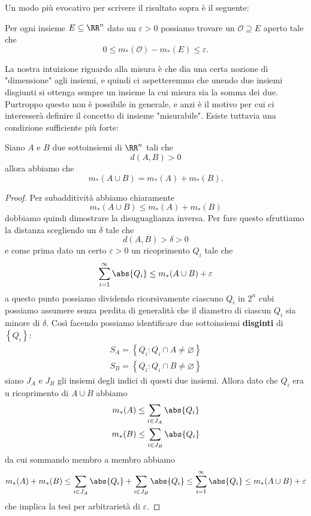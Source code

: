 \documentclass[11pt]{scrartcl}
\newcommand{\eset}{\varnothing}
\begin{document}
	Un modo più evocativo per scrivere il risultato sopra è il seguente:
	\begin{corollary}\label{Rn:approssimabilità con aperti}
		Per ogni insieme $E\subseteq\RR^n$ dato un $\varepsilon>0$ possiamo trovare un $\mathcal{O}\supseteq E$ aperto tale che
		$$0\le m_*(\mathcal{O})-m_*(E)\le \varepsilon.$$
	\end{corollary}
	La nostra intuizione riguardo alla misura è che dia una certa nozione di "dimensione" agli insiemi, e quindi ci aspetteremmo che unendo due insiemi disgiunti si ottenga sempre un insieme la cui misura sia la somma dei due. Purtroppo questo non è possibile in generale, e anzi è il motivo per cui ci interesserà definire il concetto di insieme "misurabile". Esiste tuttavia una condizione sufficiente più forte:
	\begin{proposition}\label{Rn:condizione sufficiente additività}
		Siano $A$ e $B$ due sottoinsiemi di $\RR^n$ tali che
		$$d(A,B)>0$$
		allora abbiamo che 
		$$m_*(A\cup B)=m_*(A)+m_*(B).$$
	\end{proposition}
	\begin{proof}
		Per subadditività abbiamo chiaramente
		$$m_*(A\cup B)\le m_*(A)+m_*(B)$$
		dobbiamo quindi dimostrare la disuguaglianza inversa. Per fare questo sfruttiamo la distanza scegliendo un $\delta$ tale che
		$$d(A,B)>\delta>0$$
		e come prima dato un certo $\varepsilon>0$ un ricoprimento $Q_i$ tale che
		$$\sum_{i=1}^{\infty}\abs{Q_i}\le m_*(A\cup B)+\varepsilon$$
		a questo punto possiamo dividendo ricorsivamente ciascuno $Q_i$ in $2^n$ cubi possiamo assumere senza perdita di generalità che il diametro di ciascun $Q_i$ sia minore di $\delta$. Così facendo possiamo identificare due sottoinsiemi \textbf{disginti} di $\left\{Q_i\right\}$:
		\begin{gather*}
			S_A=\left\{Q_i:Q_i\cap A\ne \eset\right\} \\
			S_B=\left\{Q_i:Q_i\cap B\ne \eset\right\}
		\end{gather*}
		siano $J_A$ e $J_B$ gli insiemi degli indici di questi due insiemi. Allora dato che $Q_i$ era u ricoprimento di $A\cup B$ abbiamo
		\begin{gather*}
			m_*(A)\le \sum_{i\in J_A}\abs{Q_i} \\
			m_*(B)\le \sum_{i\in J_B}\abs{Q_i}
		\end{gather*}
		da cui sommando membro a membro abbiamo
		$$m_*(A)+m_*(B)\le \sum_{i\in J_A}\abs{Q_i}+\sum_{i\in J_B}\abs{Q_i}\le \sum_{i=1}^{\infty}\abs{Q_i}\le m_*(A\cup B)+\varepsilon$$
		che implica la tesi per arbitrarietà di $\varepsilon$.
	\end{proof}
\end{document}
